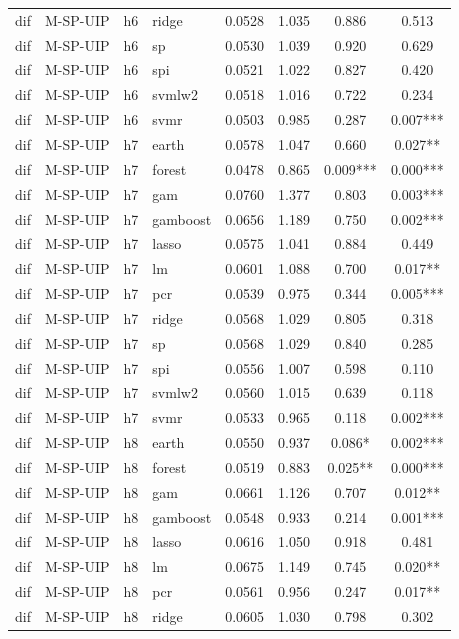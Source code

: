 \begin{ThreePartTable}
\begin{longtable}[t]{llclcccc}
dif & M-SP-UIP & h6 & ridge & 0.0528 & 1.035 & 0.886 & 0.513\\
dif & M-SP-UIP & h6 & sp & 0.0530 & 1.039 & 0.920 & 0.629\\
dif & M-SP-UIP & h6 & spi & 0.0521 & 1.022 & 0.827 & 0.420\\
dif & M-SP-UIP & h6 & svmlw2 & 0.0518 & 1.016 & 0.722 & 0.234\\
dif & M-SP-UIP & h6 & svmr & 0.0503 & 0.985 & 0.287 & 0.007***\\
\addlinespace
dif & M-SP-UIP & h7 & earth & 0.0578 & 1.047 & 0.660 & 0.027**\\
dif & M-SP-UIP & h7 & forest & 0.0478 & 0.865 & 0.009*** & 0.000***\\
dif & M-SP-UIP & h7 & gam & 0.0760 & 1.377 & 0.803 & 0.003***\\
dif & M-SP-UIP & h7 & gamboost & 0.0656 & 1.189 & 0.750 & 0.002***\\
dif & M-SP-UIP & h7 & lasso & 0.0575 & 1.041 & 0.884 & 0.449\\
dif & M-SP-UIP & h7 & lm & 0.0601 & 1.088 & 0.700 & 0.017**\\
dif & M-SP-UIP & h7 & pcr & 0.0539 & 0.975 & 0.344 & 0.005***\\
dif & M-SP-UIP & h7 & ridge & 0.0568 & 1.029 & 0.805 & 0.318\\
dif & M-SP-UIP & h7 & sp & 0.0568 & 1.029 & 0.840 & 0.285\\
dif & M-SP-UIP & h7 & spi & 0.0556 & 1.007 & 0.598 & 0.110\\
dif & M-SP-UIP & h7 & svmlw2 & 0.0560 & 1.015 & 0.639 & 0.118\\
dif & M-SP-UIP & h7 & svmr & 0.0533 & 0.965 & 0.118 & 0.002***\\
\addlinespace
dif & M-SP-UIP & h8 & earth & 0.0550 & 0.937 & 0.086* & 0.002***\\
dif & M-SP-UIP & h8 & forest & 0.0519 & 0.883 & 0.025** & 0.000***\\
dif & M-SP-UIP & h8 & gam & 0.0661 & 1.126 & 0.707 & 0.012**\\
dif & M-SP-UIP & h8 & gamboost & 0.0548 & 0.933 & 0.214 & 0.001***\\
dif & M-SP-UIP & h8 & lasso & 0.0616 & 1.050 & 0.918 & 0.481\\
dif & M-SP-UIP & h8 & lm & 0.0675 & 1.149 & 0.745 & 0.020**\\
dif & M-SP-UIP & h8 & pcr & 0.0561 & 0.956 & 0.247 & 0.017**\\
dif & M-SP-UIP & h8 & ridge & 0.0605 & 1.030 & 0.798 & 0.302\\

\end{longtable}
\end{ThreePartTable}
